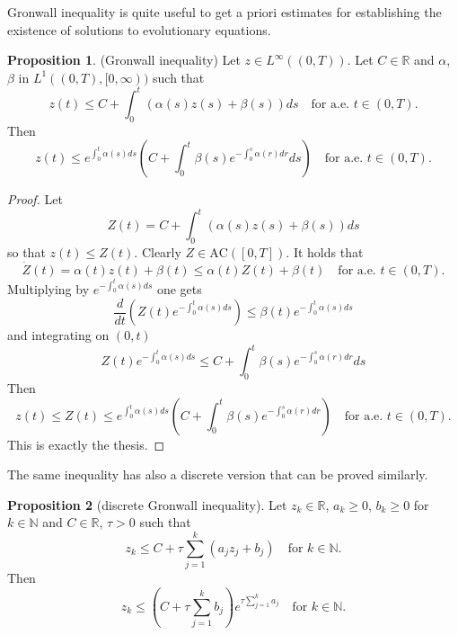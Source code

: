 \documentclass[a4paper,10pt,twoside]{amsbook}
\numberwithin{section}{chapter}
\numberwithin{equation}{chapter}
\theoremstyle{definition}
\newtheorem{prop}{Proposition}[chapter]
\begin{document}
Gronwall inequality is quite useful to get a priori estimates for establishing the existence of solutions to evolutionary equations.
\begin{prop}(Gronwall inequality)
\label{prop:gronwall}
Let $z\in L^\infty((0,T))$. Let $C\in\mathbb{R}$ and $\alpha$, $\beta$ in $L^1((0,T),[0,\infty))$ such that
\begin{equation*}
z(t)\le C+\int_0^t\left(\alpha(s)z(s)+\beta(s)\right)ds\quad\text{for a.e. $t\in(0,T)$}.
\end{equation*}
Then
\begin{equation*}
z(t)\le e^{\int_0^t\alpha(s)ds}\left(C+\int_0^t\beta(s)e^{-\int_0^s\alpha(r)dr}ds\right)\quad\text{for a.e. $t\in(0,T)$}.
\end{equation*}
\end{prop}
\begin{proof}
Let
\begin{equation*}
Z(t)=C+\int_0^t\left(\alpha(s)z(s)+\beta(s)\right)ds
\end{equation*}
so that $z(t)\le Z(t)$. Clearly $Z\in\text{AC}([0,T])$. It holds that
\begin{equation*}
\dot Z(t)=\alpha(t)z(t)+\beta(t)\le\alpha(t)Z(t)+\beta(t)\quad\text{for a.e. $t\in(0,T)$}.
\end{equation*}
Multiplying by $e^{-\int_0^t\alpha(s)ds}$ one gets
\begin{equation*}
\frac{d}{dt}\left(Z(t)e^{-\int_0^t\alpha(s)ds}\right)\le\beta(t)e^{-\int_0^t\alpha(s)ds}
\end{equation*}
and integrating on $(0,t)$
\begin{equation*}
Z(t)e^{-\int_0^t\alpha(s)ds}\le C+\int_0^t\beta(s)e^{-\int_0^s\alpha(r)dr}ds
\end{equation*}
Then
\begin{equation*}
z(t)\le Z(t)\le e^{\int_0^t\alpha(s)ds}\left(C+\int_0^t\beta(s)e^{-\int_0^s\alpha(r)dr}\right)\quad\text{for a.e. $t\in(0,T)$}.
\end{equation*}
This is exactly the thesis.
\end{proof}
The same inequality has also a discrete version that can be proved similarly.
\begin{prop}[discrete Gronwall inequality]
\label{prop:discrete-gronwall}
Let $z_k\in\mathbb{R}$, $a_k\ge0$, $b_k\ge 0$ for $k\in\mathbb{N}$ and $C\in\mathbb{R}$, $\tau>0$ such that
\[
z_k\le C+\tau\sum_{j=1}^k(a_jz_j+b_j)\quad\text{for $k\in\mathbb{N}$}.
\]
Then
\[
z_k\le\left(C+\tau\sum_{j=1}^kb_j\right)e^{\tau\sum_{j=1}^ka_j}\quad\text{for $k\in\mathbb{N}$}.
\]
\end{prop}
\end{document}

